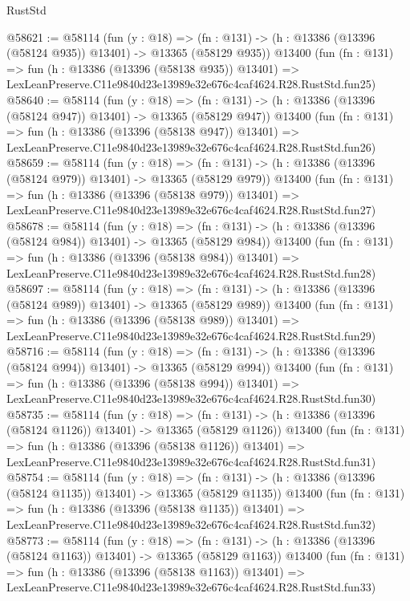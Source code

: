 \begin{lexlean}{RustStd}
\begin{coremodule}
@58621 := @58114
    (fun (y : @18) =>
    (fn : @131) -> (h : @13386 (@13396 (@58124 @935)) @13401) -> @13365 (@58129 @935))
    @13400
    (fun (fn : @131) =>
    fun (h : @13386 (@13396 (@58138 @935)) @13401) =>
    LexLeanPreserve.C11e9840d23e13989e32e676c4caf4624.R28.RustStd.fun25)
@58640 := @58114
    (fun (y : @18) =>
    (fn : @131) -> (h : @13386 (@13396 (@58124 @947)) @13401) -> @13365 (@58129 @947))
    @13400
    (fun (fn : @131) =>
    fun (h : @13386 (@13396 (@58138 @947)) @13401) =>
    LexLeanPreserve.C11e9840d23e13989e32e676c4caf4624.R28.RustStd.fun26)
@58659 := @58114
    (fun (y : @18) =>
    (fn : @131) -> (h : @13386 (@13396 (@58124 @979)) @13401) -> @13365 (@58129 @979))
    @13400
    (fun (fn : @131) =>
    fun (h : @13386 (@13396 (@58138 @979)) @13401) =>
    LexLeanPreserve.C11e9840d23e13989e32e676c4caf4624.R28.RustStd.fun27)
@58678 := @58114
    (fun (y : @18) =>
    (fn : @131) -> (h : @13386 (@13396 (@58124 @984)) @13401) -> @13365 (@58129 @984))
    @13400
    (fun (fn : @131) =>
    fun (h : @13386 (@13396 (@58138 @984)) @13401) =>
    LexLeanPreserve.C11e9840d23e13989e32e676c4caf4624.R28.RustStd.fun28)
@58697 := @58114
    (fun (y : @18) =>
    (fn : @131) -> (h : @13386 (@13396 (@58124 @989)) @13401) -> @13365 (@58129 @989))
    @13400
    (fun (fn : @131) =>
    fun (h : @13386 (@13396 (@58138 @989)) @13401) =>
    LexLeanPreserve.C11e9840d23e13989e32e676c4caf4624.R28.RustStd.fun29)
@58716 := @58114
    (fun (y : @18) =>
    (fn : @131) -> (h : @13386 (@13396 (@58124 @994)) @13401) -> @13365 (@58129 @994))
    @13400
    (fun (fn : @131) =>
    fun (h : @13386 (@13396 (@58138 @994)) @13401) =>
    LexLeanPreserve.C11e9840d23e13989e32e676c4caf4624.R28.RustStd.fun30)
@58735 := @58114
    (fun (y : @18) =>
    (fn : @131) -> (h : @13386 (@13396 (@58124 @1126)) @13401) -> @13365 (@58129 @1126))
    @13400
    (fun (fn : @131) =>
    fun (h : @13386 (@13396 (@58138 @1126)) @13401) =>
    LexLeanPreserve.C11e9840d23e13989e32e676c4caf4624.R28.RustStd.fun31)
@58754 := @58114
    (fun (y : @18) =>
    (fn : @131) -> (h : @13386 (@13396 (@58124 @1135)) @13401) -> @13365 (@58129 @1135))
    @13400
    (fun (fn : @131) =>
    fun (h : @13386 (@13396 (@58138 @1135)) @13401) =>
    LexLeanPreserve.C11e9840d23e13989e32e676c4caf4624.R28.RustStd.fun32)
@58773 := @58114
    (fun (y : @18) =>
    (fn : @131) -> (h : @13386 (@13396 (@58124 @1163)) @13401) -> @13365 (@58129 @1163))
    @13400
    (fun (fn : @131) =>
    fun (h : @13386 (@13396 (@58138 @1163)) @13401) =>
    LexLeanPreserve.C11e9840d23e13989e32e676c4caf4624.R28.RustStd.fun33)

\end{coremodule}
\end{lexlean}

